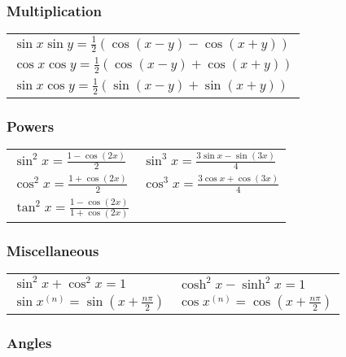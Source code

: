 \documentclass[a4paper, 10pt]{article}
\theoremstyle{definition}
\theoremstyle{ex}
\theoremstyle{named}
\begin{document}
\subsubsection*{Multiplication}
\begin{tabularx}{\linewidth}{X}
    $\sin x \sin y = \frac{1}{2}(\cos(x - y) - \cos(x + y))$ \\
    $\cos x \cos y = \frac{1}{2}(\cos(x - y) + \cos(x + y))$ \\
    $\sin x \cos y = \frac{1}{2}(\sin(x - y) + \sin(x + y))$ \\
\end{tabularx}

\subsubsection*{Powers}
\begin{tabularx}{\linewidth}{XX}
    $\sin^2 x = \frac{1 - \cos(2x)}{2}$ & $\sin^3 x = \frac{3 \sin x - \sin(3x)}{4}$ \\
    $\cos^2 x = \frac{1 + \cos(2x)}{2}$ & $\cos^3 x = \frac{3 \cos x + \cos(3x)}{4}$ \\
    $\tan^2 x = \frac{1 - \cos(2x)}{1 + \cos(2x)}$
\end{tabularx}

\subsubsection*{Miscellaneous}
\begin{tabularx}{\linewidth}{XX}
    $\sin^2 x + \cos^2 x = 1$ & $\cosh^2 x - \sinh^2 x = 1$ \\
    $\sin x^{(n)} = \sin\left(x + \frac{n \pi}{2}\right)$ & $\cos x^{(n)} = \cos\left(x + \frac{n \pi}{2}\right)$
\end{tabularx}

\subsubsection*{Angles}
\end{document}
